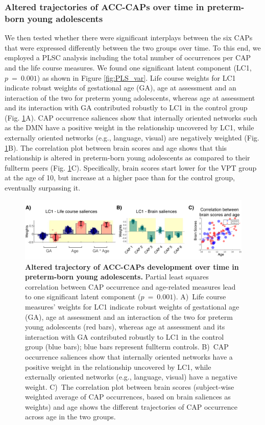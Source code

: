 \subsubsection*{Altered trajectories of ACC-CAPs over time in preterm-born young adolescents} We then tested whether there were significant interplays between the six CAPs that were expressed differently between the two groups over time. To this end, we employed a PLSC analysis including the total number of occurrences per CAP and the life course measures. We found one significant latent component (LC1, $p~=~0.001$) as shown in Figure \ref{fig:PLS_var}. Life course weights for LC1  indicate robust weights of gestational age (GA), age at assessment and an interaction of the two for preterm young adolescents, whereas age at assessment and its interaction with GA contributed robustly to LC1 in the control group (Fig. \ref{fig:PLS_CAPs}A). CAP occurrence saliences show that internally oriented networks such as the DMN have a positive weight in the relationship uncovered by LC1, while externally oriented networks (e.g., language, visual) are negatively weighted (Fig. \ref{fig:PLS_CAPs}B). The correlation plot between brain scores and age shows that this relationship is altered in preterm-born young adolescents as compared to their fullterm peers (Fig. \ref{fig:PLS_CAPs}C). Specifically, brain scores start lower for the VPT group at the age of 10, but increase at a higher pace than for the control group, eventually surpassing it. 



\begin{figure}[h]
\centering\includegraphics[width=1\linewidth]{images/Ch3/Fig4_CAPs_PLS_results.png}
\caption{\textbf{Altered trajectory of ACC-CAPs development over time in preterm-born young adolescents.} Partial least squares correlation between CAP occurrence and age-related measures lead to one significant latent component ($p~=~0.001$).   A)~Life course measures' weights for LC1  indicate robust weights of gestational age (GA), age at assessment and an interaction of the two for preterm young adolescents (red bars), whereas age at assessment and its interaction with GA contributed robustly to LC1 in the control group (blue bars); blue bars represent fullterm controls. B)~CAP occurrence saliences show that internally oriented networks have a positive weight in the relationship uncovered by LC1, while externally oriented networks (e.g., language, visual) have a negative weight.  C)~The correlation plot between brain scores (subject-wise weighted average of CAP occurrences, based on brain saliences as weights) and age shows the different trajectories of CAP occurrence across age in the two groups.} \label{fig:PLS_CAPs}
\end{figure}




